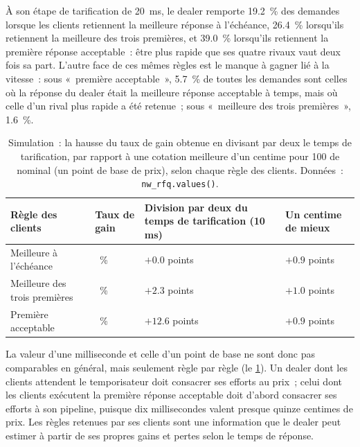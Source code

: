 À son étape de tarification de \qty{20}{\milli\second}, le dealer remporte 19.2~\% des demandes lorsque les clients retiennent la meilleure réponse à l'échéance, 26.4~\%
lorsqu'ils retiennent la meilleure des trois premières, et 39.0~\% lorsqu'ils retiennent la première réponse acceptable~: être plus rapide que ses quatre rivaux vaut
deux fois sa part. L'autre face de ces mêmes règles est le manque à gagner lié à la vitesse~: sous «~première acceptable~», 5.7~\% de toutes les demandes
sont celles où la réponse du dealer était la meilleure réponse acceptable à temps, mais où celle d'un rival plus rapide a été retenue~; sous «~meilleure des trois premières~»,
1.6~\%.

\begin{table}[ht]
\centering\small
\begin{tabular}{@{}>{\raggedright\arraybackslash}p{4.0cm}>{\centering\arraybackslash}p{2.6cm}>{\centering\arraybackslash}p{4.2cm}>{\centering\arraybackslash}p{2.6cm}@{}}
\toprule
Règle des clients & Taux de gain & Division par deux du temps de tarification (10 ms) & Un centime de mieux \\
\midrule
Meilleure à l'échéance & 19.2~\% & $+0.0$ points & $+0.9$ points \\
Meilleure des trois premières & 26.4~\% & $+2.3$ points & $+1.0$ points \\
Première acceptable & 39.0~\% & $+12.6$ points & $+0.9$ points \\
\bottomrule
\end{tabular}
\caption{Simulation~: la hausse du taux de gain obtenue en divisant par deux le temps de tarification, par rapport à une cotation meilleure d'un centime pour 100 de nominal (un point de
base de prix), selon chaque règle des clients. Données~: \texttt{nw\_rfq.values()}.}\label{tab:nw:fixed-income-and-rfq-platform-connectivity:value}
\end{table}

La valeur d'une milliseconde et celle d'un point de base ne sont donc pas comparables en général, mais seulement règle par règle
(le \cref{tab:nw:fixed-income-and-rfq-platform-connectivity:value}). Un dealer dont les clients attendent le temporisateur doit consacrer ses efforts au prix~; celui
dont les clients exécutent la première réponse acceptable doit d'abord consacrer ses efforts à son pipeline, puisque dix millisecondes valent presque quinze centimes de
prix. Les règles retenues par ses clients sont une information que le dealer peut estimer à partir de ses propres gains et pertes selon le temps de réponse.

